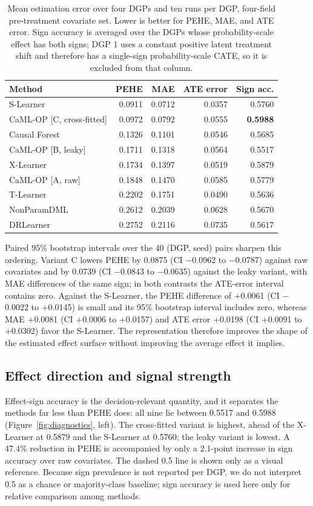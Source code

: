\documentclass{article}
\begin{document}
\begin{table}[t]
\caption{Mean estimation error over four DGPs and ten runs per DGP, four-field pre-treatment covariate set. Lower is better for PEHE, MAE, and ATE error. Sign accuracy is averaged over the DGPs whose probability-scale effect has both signs; DGP 1 uses a constant positive latent treatment shift and therefore has a single-sign probability-scale CATE, so it is excluded from that column.}
\label{tab:main}
\centering\footnotesize
\begin{tabular}{lrrrr}\toprule
Method & PEHE & MAE & ATE error & Sign acc.\\\midrule
S-Learner & 0.0911 & 0.0712 & 0.0357 & 0.5760\\
CaML-OP [C, cross-fitted] & 0.0972 & 0.0792 & 0.0555 & \textbf{0.5988}\\
Causal Forest & 0.1326 & 0.1101 & 0.0546 & 0.5685\\
CaML-OP [B, leaky] & 0.1711 & 0.1318 & 0.0564 & 0.5517\\
X-Learner & 0.1734 & 0.1397 & 0.0519 & 0.5879\\
CaML-OP [A, raw] & 0.1848 & 0.1470 & 0.0585 & 0.5779\\
T-Learner & 0.2202 & 0.1751 & 0.0490 & 0.5636\\
NonParamDML & 0.2612 & 0.2039 & 0.0628 & 0.5670\\
DRLearner & 0.2752 & 0.2116 & 0.0735 & 0.5617\\\bottomrule
\end{tabular}
\end{table}

Paired 95\% bootstrap intervals over the 40 (DGP, seed) pairs sharpen this ordering. Variant C lowers PEHE by 0.0875 (CI $-$0.0962 to $-$0.0787) against raw covariates and by 0.0739 (CI $-$0.0843 to $-$0.0635) against the leaky variant, with MAE differences of the same sign; in both contrasts the ATE-error interval contains zero. Against the S-Learner, the PEHE difference of $+$0.0061 (CI $-$0.0022 to $+$0.0145) is small and its 95\% bootstrap interval includes zero, whereas MAE $+$0.0081 (CI $+$0.0006 to $+$0.0157) and ATE error $+$0.0198 (CI $+$0.0091 to $+$0.0302) favor the S-Learner. The representation therefore improves the shape of the estimated effect surface without improving the average effect it implies.

\subsection{Effect direction and signal strength}
Effect-sign accuracy is the decision-relevant quantity, and it separates the methods far less than PEHE does: all nine lie between 0.5517 and 0.5988 (Figure~\ref{fig:diagnostics}, left). The cross-fitted variant is highest, ahead of the X-Learner at 0.5879 and the S-Learner at 0.5760; the leaky variant is lowest. A 47.4\% reduction in PEHE is accompanied by only a 2.1-point increase in sign accuracy over raw covariates. The dashed 0.5 line is shown only as a visual reference. Because sign prevalence is not reported per DGP, we do not interpret 0.5 as a chance or majority-class baseline; sign accuracy is used here only for relative comparison among methods.
\end{document}
